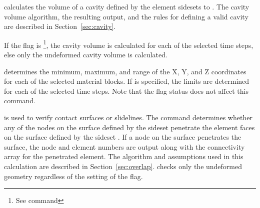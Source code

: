  {
 calculates the volume of a cavity defined by the element
sidesets  to .  The cavity volume
algorithm, the resulting output, and the rules for defining a valid
cavity are described in Section~\ref{sec:cavity}. 

If the  flag is \footnote{See command
}, the cavity volume is calculated for each of the selected
time steps, else only the undeformed cavity volume is calculated. 
}

 {
 determines the minimum, maximum, and range of the 
X, Y, and Z coordinates for each of the selected material blocks.
If  is specified, the limits are determined for each of
the selected time steps.  Note that the  flag status does
not affect this command.
}

 {
 is used to verify contact surfaces or slidelines.  The
command determines whether any of the nodes on the surface defined by
the sideset  penetrate the element faces on the surface
defined by the sideset .  If a node on the
 surface penetrates the  surface, the
node and element numbers are output along with the connectivity array
for the penetrated element. The algorithm and assumptions used in this
calculation are described in Section~\ref{sec:overlap}.  
checks only the undeformed geometry regardless of the setting of the
 flag. 
}

